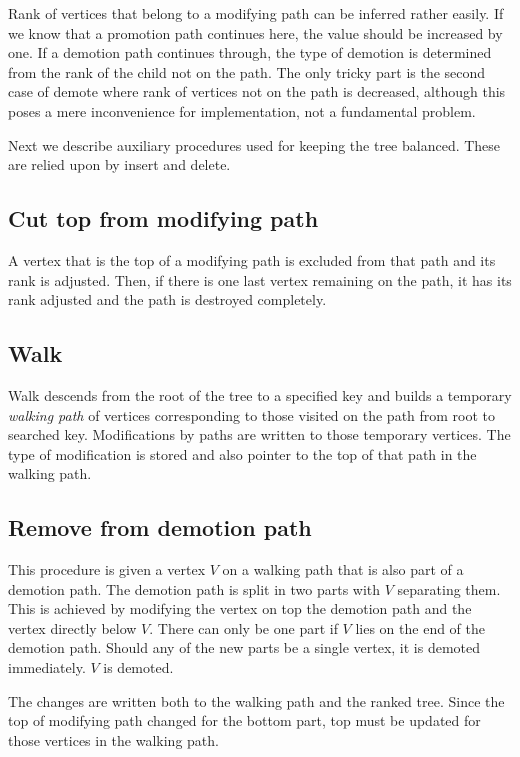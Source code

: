Rank of vertices that belong to a modifying path can be inferred rather easily. If we know that a promotion path continues here, the value should be increased by one. If a demotion path continues through, the type of demotion is determined from the rank of the child not on the path. The only tricky part is the second case of demote where rank of vertices not on the path is decreased, although this poses a mere inconvenience for implementation, not a fundamental problem.

Next we describe auxiliary procedures used for keeping the tree balanced. These are relied upon by insert and delete.

\subsection{Cut top from modifying path}

A vertex that is the top of a modifying path is excluded from that path and its rank is adjusted. Then, if there is one last vertex remaining on the path, it has its rank adjusted and the path is destroyed completely.

\subsection{Walk}

Walk descends from the root of the tree to a specified key and builds a temporary {\em walking path} of vertices corresponding to those visited on the path from root to searched key. Modifications by paths are written to those temporary vertices. The type of modification is stored and also pointer to the top of that path in the walking path.

\subsection{Remove from demotion path}

This procedure is given a vertex $V$ on a walking path that is also part of a demotion path. The demotion path is split in two parts with $V$ separating them. This is achieved by modifying the vertex on top the demotion path and the vertex directly below $V$. There can only be one part if $V$ lies on the end of the demotion path. Should any of the new parts be a single vertex, it is demoted immediately. $V$ is demoted.

The changes are written both to the walking path and the ranked tree. Since the top of modifying path changed for the bottom part, top must be updated for those vertices in the walking path.

